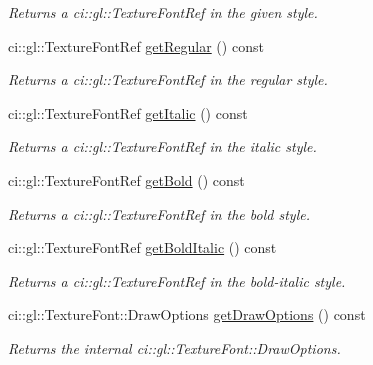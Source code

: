 \begin{DoxyCompactItemize}
\begin{DoxyCompactList}\small\item\em Returns a ci\-::gl\-::\-Texture\-Font\-Ref in the given style. \end{DoxyCompactList}\item 
\hypertarget{class_font_family_node_a26f91f4691b49dd3a806d833a3e3fa3f}{ci\-::gl\-::\-Texture\-Font\-Ref \hyperlink{class_font_family_node_a26f91f4691b49dd3a806d833a3e3fa3f}{get\-Regular} () const }\label{class_font_family_node_a26f91f4691b49dd3a806d833a3e3fa3f}

\begin{DoxyCompactList}\small\item\em Returns a ci\-::gl\-::\-Texture\-Font\-Ref in the regular style. \end{DoxyCompactList}\item 
\hypertarget{class_font_family_node_a658ee245c316e29fc2be8696fd47ce8c}{ci\-::gl\-::\-Texture\-Font\-Ref \hyperlink{class_font_family_node_a658ee245c316e29fc2be8696fd47ce8c}{get\-Italic} () const }\label{class_font_family_node_a658ee245c316e29fc2be8696fd47ce8c}

\begin{DoxyCompactList}\small\item\em Returns a ci\-::gl\-::\-Texture\-Font\-Ref in the italic style. \end{DoxyCompactList}\item 
\hypertarget{class_font_family_node_a354a4ea3780d90a2b36819049a92c60b}{ci\-::gl\-::\-Texture\-Font\-Ref \hyperlink{class_font_family_node_a354a4ea3780d90a2b36819049a92c60b}{get\-Bold} () const }\label{class_font_family_node_a354a4ea3780d90a2b36819049a92c60b}

\begin{DoxyCompactList}\small\item\em Returns a ci\-::gl\-::\-Texture\-Font\-Ref in the bold style. \end{DoxyCompactList}\item 
\hypertarget{class_font_family_node_a7bdcd92bfdde466177069d3a70901c34}{ci\-::gl\-::\-Texture\-Font\-Ref \hyperlink{class_font_family_node_a7bdcd92bfdde466177069d3a70901c34}{get\-Bold\-Italic} () const }\label{class_font_family_node_a7bdcd92bfdde466177069d3a70901c34}

\begin{DoxyCompactList}\small\item\em Returns a ci\-::gl\-::\-Texture\-Font\-Ref in the bold-\/italic style. \end{DoxyCompactList}\item 
\hypertarget{class_font_family_node_a90eb2fea1d8914aa4a3e2482bf9601d3}{ci\-::gl\-::\-Texture\-Font\-::\-Draw\-Options \hyperlink{class_font_family_node_a90eb2fea1d8914aa4a3e2482bf9601d3}{get\-Draw\-Options} () const }\label{class_font_family_node_a90eb2fea1d8914aa4a3e2482bf9601d3}

\begin{DoxyCompactList}\small\item\em Returns the internal ci\-::gl\-::\-Texture\-Font\-::\-Draw\-Options. \end{DoxyCompactList}\end{DoxyCompactItemize}


